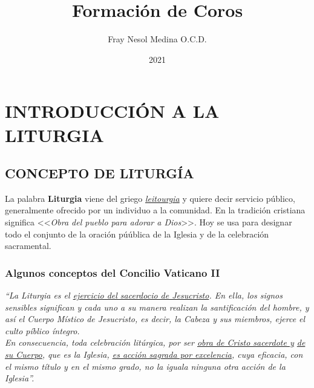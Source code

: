 \documentclass[letterpaper, 12pt]{book}
\title{\Huge{\textbf{Formaci\'on de Coros}}}
\author{\Large{Fray Nesol Medina O.C.D.}}
\date{\large{2021}}
\begin{document}
    \maketitle
    \tableofcontents
    
    \part {INTRODUCCI\'ON A LA LITURGIA}
    
    \chapter{CONCEPTO DE LITURG\'IA}
    La palabra \textbf{Liturgia} viene del griego \textit{\underline{leitourgia}} y quiere decir servicio p\'ublico, generalmente ofrecido por un individuo a la comunidad. En la tradici\'on cristiana significa <<\textit{Obra del pueblo para adorar a Dios}>>. Hoy se usa para designar todo el conjunto de la oraci\'on pú\'ublica de la Iglesia y de la celebraci\'on sacramental.
    
    \section{Algunos conceptos del Concilio Vaticano II}
    \textit{``La Liturgia es el \underline{ejercicio del sacerdocio de Jesucristo}. En ella, los signos sensibles significan y cada uno a su manera realizan la santificación del hombre, y as\'i el Cuerpo M\'istico de Jesucristo, es decir, la Cabeza y sus miembros, ejerce el culto p\'iblico \'integro.\\
    En consecuencia, toda celebración lit\'urgica, por ser \underline{obra de Cristo sacerdote y} \underline{de su Cuerpo}, que es la Iglesia, \underline{es acción sagrada por excelencia}, cuya eficacia, con el mismo t\'itulo y en el mismo grado, no la iguala ninguna otra acci\'on de la Iglesia''.}
    
\end{document}
